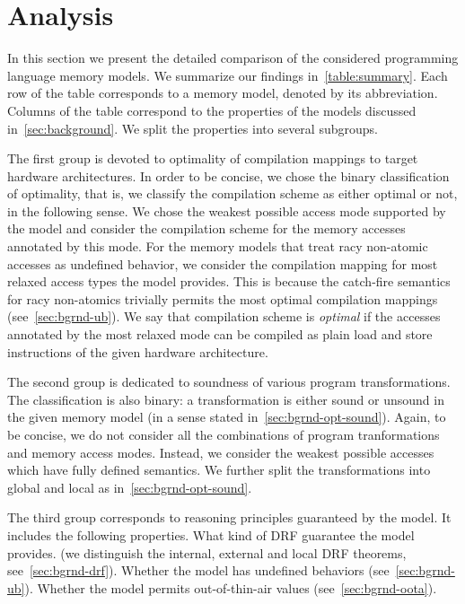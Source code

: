 \section{Analysis}

In this section we present the detailed comparison 
of the considered programming language memory models. 
We summarize our findings in~\cref{table:summary}.
Each row of the table corresponds to a memory model, denoted by its abbreviation. 
Columns of the table correspond to the properties of the models discussed in~\cref{sec:background}.
We split the properties into several subgroups. 

The first group is devoted to optimality of compilation mappings
to target hardware architectures. In order to be concise, 
we chose the binary classification of optimality, 
that is, we classify the compilation scheme as either optimal or not,
in the following sense.
We chose the weakest possible access mode supported by the model
and consider the compilation scheme for the memory accesses annotated by this mode. 
For the memory models that treat racy non-atomic accesses
as undefined behavior, we consider the compilation mapping
for most relaxed access types the model provides.
This is because the catch-fire semantics for racy non-atomics 
trivially permits the most optimal compilation mappings (see~\cref{sec:bgrnd-ub}).
We say that compilation scheme is \emph{optimal} if the 
accesses annotated by the most relaxed mode 
can be compiled as plain load and store instructions 
of the given hardware architecture. 

The second group is dedicated to soundness of various program transformations. 
The classification is also binary: a transformation is either sound or unsound 
in the given memory model (in a sense stated in~\cref{sec:bgrnd-opt-sound}).
Again, to be concise, we do not consider all the combinations 
of program tranformations and memory access modes. 
Instead, we consider the weakest possible accesses which have fully defined semantics. 
We further split the transformations into global and local as in~\cref{sec:bgrnd-opt-sound}.

The third group corresponds to reasoning principles guaranteed by the model. 
It includes the following properties. What kind of DRF guarantee the model provides.
(we distinguish the internal, external and local DRF theorems, see~\cref{sec:bgrnd-drf}).
Whether the model has undefined behaviors (see~\cref{sec:bgrnd-ub}).
Whether the model permits out-of-thin-air values (see~\cref{sec:bgrnd-oota}).

